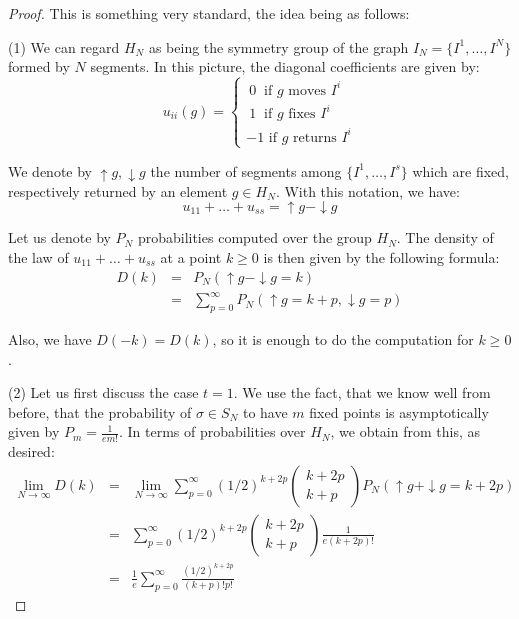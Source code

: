 \documentclass[12pt]{amsbook}
\begin{document}
\begin{proof}
This is something very standard, the idea being as follows:

\medskip

(1) We can regard $H_N$ as being the symmetry group of the graph $I_N=\{I^1,\ldots ,I^N\}$ formed by $N$ segments. In this picture, the diagonal coefficients are given by:
$$u_{ii}(g)=\begin{cases}
\ 0\ \mbox{ if $g$ moves $I^i$}\\
\ 1\ \mbox{ if $g$ fixes $I^i$}\\
-1\mbox{ if $g$ returns $I^i$}
\end{cases}$$

We denote by $\uparrow g,\downarrow g$ the number of segments among $\{I^1,\ldots ,I^s\}$ which are fixed, respectively returned by an element $g\in H_N$. With this notation, we have:
$$u_{11}+\ldots+u_{ss}=\uparrow g-\downarrow g$$

Let us denote by $P_N$ probabilities computed over the group $H_N$. The density of the law of $u_{11}+\ldots+u_{ss}$ at a point $k\geq 0$ is then given by the following formula:
\begin{eqnarray*}
D(k)
&=&P_N(\uparrow g-\downarrow g=k)\\
&=&\sum_{p=0}^\infty P_N(\uparrow g=k+p, \downarrow g=p)
\end{eqnarray*}

Also, we have $D(-k)=D(k)$, so it is enough to do the computation for $k\geq0$.

\medskip

(2) Let us first discuss the case $t=1$. We use the fact, that we know well from before, that the probability of $\sigma\in S_N$ to have $m$ fixed points is asymptotically given by $P_m=\frac{1}{em!}$. In terms of probabilities over $H_N$, we obtain from this, as desired:
\begin{eqnarray*}
\lim_{N\to\infty}D(k)
&=&\lim_{N\to\infty}\sum_{p=0}^\infty(1/2)^{k+2p}\begin{pmatrix}k+2p\\ k+p\end{pmatrix} P_N(\uparrow g+\downarrow g=k+2p)\\ 
&=&\sum_{p=0}^\infty(1/2)^{k+2p}\begin{pmatrix}k+2p\\
k+p\end{pmatrix}\frac{1}{e(k+2p)!}\\
&=&\frac{1}{e}\sum_{p=0}^\infty \frac{(1/2)^{k+2p}}{(k+p)!p!}
\end{eqnarray*}


\end{proof}
\end{document}

